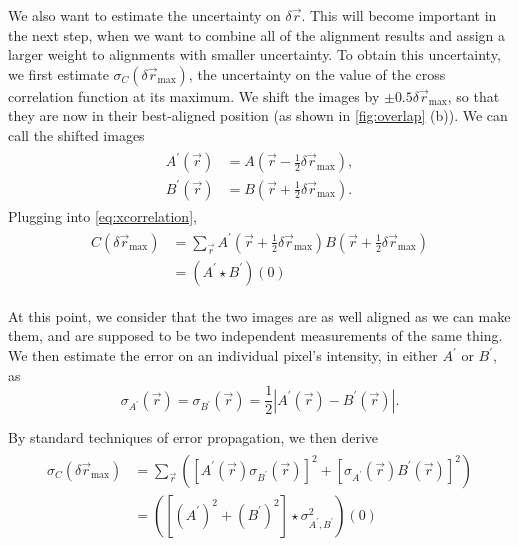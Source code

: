 \documentclass{article}
\begin{document}
We also want to estimate the uncertainty on $\delta\vec{r}$.  This will become important in the next step, when we want to combine all of the alignment results and assign a larger weight to alignments with smaller uncertainty.  To obtain this uncertainty, we first estimate $\sigma_C(\delta\vec{r}_\text{max})$, the uncertainty on the value of the cross correlation function at its maximum.  We shift the images by $\pm0.5\delta\vec{r}_\text{max}$, so that they are now in their best-aligned position (as shown in \cref{fig:overlap} (b)).  We can call the shifted images
\begin{align}
\begin{aligned}
A^\prime(\vec{r})&=A\left(\vec{r}-\frac{1}{2}\delta\vec{r}_\text{max}\right), \\
B^\prime(\vec{r})&=B\left(\vec{r}+\frac{1}{2}\delta\vec{r}_\text{max}\right).
\end{aligned}
\end{align}
Plugging into \cref{eq:xcorrelation},
\begin{align}
\begin{aligned}
C(\delta\vec{r}_\text{max})&=\sum_{\vec{r}}A^\prime\left(\vec{r}+\frac{1}{2}\delta\vec{r}_\text{max}\right) B\left(\vec{r}+\frac{1}{2}\delta\vec{r}_\text{max}\right) \\
&=(A^\prime\star B^\prime)(0)
\end{aligned}
\end{align}

At this point, we consider that the two images are as well aligned as we can make them, and are supposed to be two independent measurements of the same thing.  We then estimate the error on an individual pixel's intensity, in either $A^\prime$ or $B^\prime$, as
\begin{equation}
\sigma_{A^\prime}(\vec{r})=\sigma_{B^\prime}(\vec{r})=\frac{1}{2}\left|A^\prime(\vec{r})-B^\prime(\vec{r})\right|.
\end{equation}

By standard techniques of error propagation, we then derive
\begin{align}
\begin{aligned}
\sigma_C(\delta\vec{r}_\text{max})&=\sum_{\vec{r}}\left(\left[A^\prime(\vec{r})\sigma_{B^\prime}(\vec{r})\right]^2+\left[\sigma_{A^\prime}(\vec{r})B^\prime(\vec{r})\right]^2\right) \\
&=([(A^\prime)^2+(B^\prime)^2]\star\sigma_{A^\prime,B^\prime}^2)(0)
\end{aligned}
\end{align}
\end{document}
